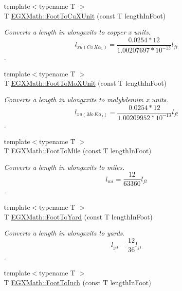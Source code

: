 \begin{DoxyCompactItemize}
{\footnotesize template$<$typename T $>$ }\\T \mbox{\hyperlink{group___e_g_x_math-_conversions-_length_conversions-_imperial-_foot-_non-_s_i_ga965e1b5a43bec32129d8319540036be1}{E\+G\+X\+Math\+::\+Foot\+To\+Cu\+X\+Unit}} (const T length\+In\+Foot)
\begin{DoxyCompactList}\small\item\em Converts a length in ulongxxits to copper x units. \[ l_{xu(Cu\ K\alpha_1)}=\frac{0.0254 * 12}{1.00207697*10^{-13}} l_{ft}\]. \end{DoxyCompactList}\item 
{\footnotesize template$<$typename T $>$ }\\T \mbox{\hyperlink{group___e_g_x_math-_conversions-_length_conversions-_imperial-_foot-_non-_s_i_ga06bc5f701660697593ed1aacd4abd3d6}{E\+G\+X\+Math\+::\+Foot\+To\+Mo\+X\+Unit}} (const T length\+In\+Foot)
\begin{DoxyCompactList}\small\item\em Converts a length in ulongxxits to molybdenum x units. \[ l_{xu(Mo\ K\alpha_1)}=\frac{0.0254 * 12}{1.00209952*10^{-13}} l_{ft}\]. \end{DoxyCompactList}\item 
{\footnotesize template$<$typename T $>$ }\\T \mbox{\hyperlink{group___e_g_x_math-_conversions-_length_conversions-_imperial-_foot-_imperial_gae582c3dbb801f710a44fe2eec4af1309}{E\+G\+X\+Math\+::\+Foot\+To\+Mile}} (const T length\+In\+Foot)
\begin{DoxyCompactList}\small\item\em Converts a length in ulongxxits to miles. \[ l_{mi}=\frac{12}{63360} l_{ft} \]. \end{DoxyCompactList}\item 
{\footnotesize template$<$typename T $>$ }\\T \mbox{\hyperlink{group___e_g_x_math-_conversions-_length_conversions-_imperial-_foot-_imperial_ga19dfde4f9f3e82791f94c713ee3ee2ad}{E\+G\+X\+Math\+::\+Foot\+To\+Yard}} (const T length\+In\+Foot)
\begin{DoxyCompactList}\small\item\em Converts a length in ulongxxits to yards. \[ l_{yd}= \frac{12}{36} l_{ft} \]. \end{DoxyCompactList}\item 
{\footnotesize template$<$typename T $>$ }\\T \mbox{\hyperlink{group___e_g_x_math-_conversions-_length_conversions-_imperial-_foot-_imperial_ga2018d690827394d8a88e1a0d046f8e8d}{E\+G\+X\+Math\+::\+Foot\+To\+Inch}} (const T length\+In\+Foot)

\end{DoxyCompactItemize}
